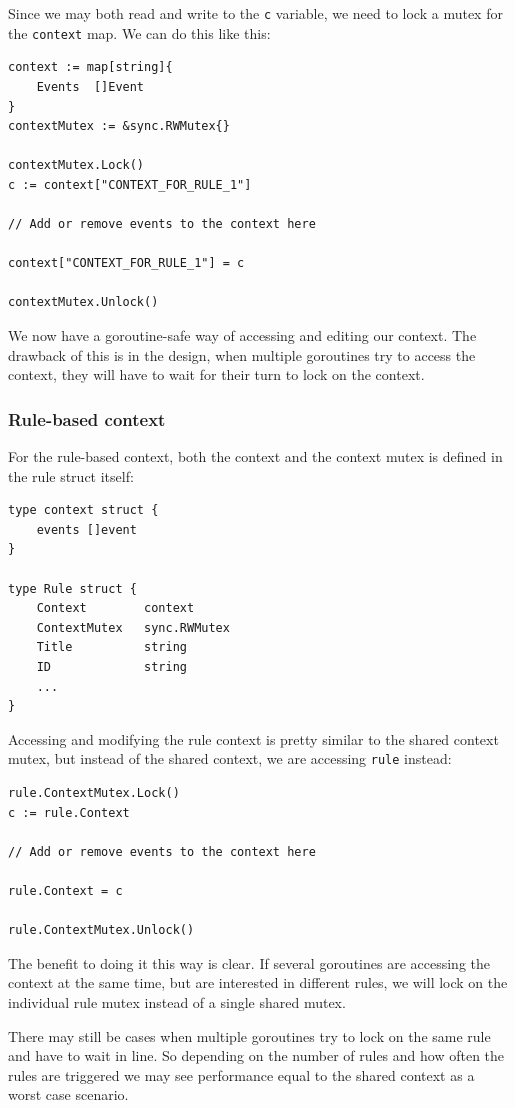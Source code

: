 Since we may both read and write to the \lstinline{c} variable, we need to lock a mutex for the \lstinline{context} map. We can do this like this:

\begin{lstlisting}
context := map[string]{
    Events  []Event
}
contextMutex := &sync.RWMutex{}

contextMutex.Lock()
c := context["CONTEXT_FOR_RULE_1"]

// Add or remove events to the context here

context["CONTEXT_FOR_RULE_1"] = c

contextMutex.Unlock()
\end{lstlisting}

We now have a goroutine-safe way of accessing and editing our context. The drawback of this is in the design, when multiple goroutines try to access the context, they will have to wait for their turn to lock on the context.

\subsubsection{Rule-based context}
For the rule-based context, both the context and the context mutex is defined in the rule struct itself:
\begin{lstlisting}
type context struct {
    events []event
}

type Rule struct {
	Context        context
	ContextMutex   sync.RWMutex
	Title          string
	ID             string
	...
}
\end{lstlisting}
Accessing and modifying the rule context is pretty similar to the shared context mutex, but instead of the shared context, we are accessing \lstinline{rule} instead:
\begin{lstlisting}
rule.ContextMutex.Lock()
c := rule.Context

// Add or remove events to the context here

rule.Context = c

rule.ContextMutex.Unlock()
\end{lstlisting}


The benefit to doing it this way is clear. If several goroutines are accessing the context at the same time, but are interested in different rules, we will lock on the individual rule mutex instead of a single shared mutex.

There may still be cases when multiple goroutines try to lock on the same rule and have to wait in line. So depending on the number of rules and how often the rules are triggered we may see performance equal to the shared context as a worst case scenario.

